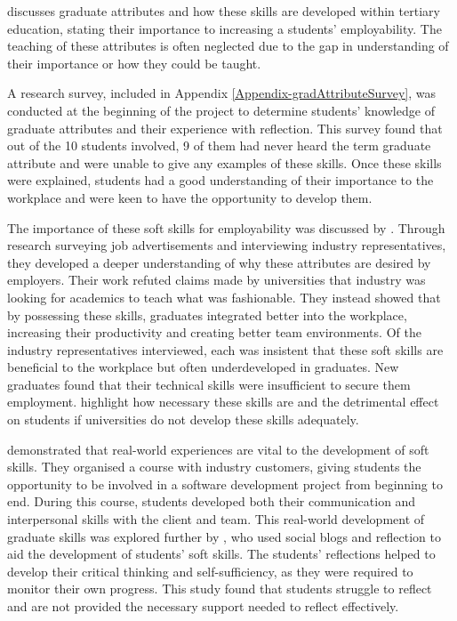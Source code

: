 \documentclass{l4proj}
\begin{document}
\citet{barr_2019} discusses graduate attributes and how these skills are developed within tertiary education, stating their importance to increasing a students’ employability. The teaching of these attributes is often neglected due to the gap in understanding of their importance or how they could be taught.

A research survey, included in Appendix \ref{Appendix-gradAttributeSurvey}, was conducted at the beginning of the project to determine students' knowledge of graduate attributes and their experience with reflection. This survey found that out of the 10 students involved, 9 of them had never heard the term graduate attribute and were unable to give any examples of these skills. Once these skills were explained, students had a good understanding of their importance to the workplace and were keen to have the opportunity to develop them. 

The importance of these soft skills for employability was discussed by \citet{stevens_industry_2016}. Through research surveying job advertisements and interviewing industry representatives, they developed a deeper understanding of why these attributes are desired by employers. Their work refuted claims made by universities that industry was looking for academics to teach what was fashionable. They instead showed that by possessing these skills, graduates integrated better into the workplace, increasing their productivity and creating better team environments. Of the industry representatives interviewed, each was insistent that these soft skills are beneficial to the workplace but often underdeveloped in graduates. New graduates found that their technical skills were insufficient to secure them employment. \citet{stevens_industry_2016} highlight how necessary these skills are and the detrimental effect on students if universities do not develop these skills adequately.

\citet{abernethy_teaching_2009} demonstrated that real-world experiences are vital to the development of soft skills. They organised a course with industry customers, giving students the opportunity to be involved in a software development project from beginning to end. During this course, students developed both their communication and interpersonal skills with the client and team. This real-world development of graduate skills was explored further by \citet{mcdermott_developing_nodate}, who used social blogs and reflection to aid the development of students' soft skills. The students' reflections helped to develop their critical thinking and self-sufficiency, as they were required to monitor their own progress. This study found that students struggle to reflect and are not provided the necessary support needed to reflect effectively. 
\end{document}

